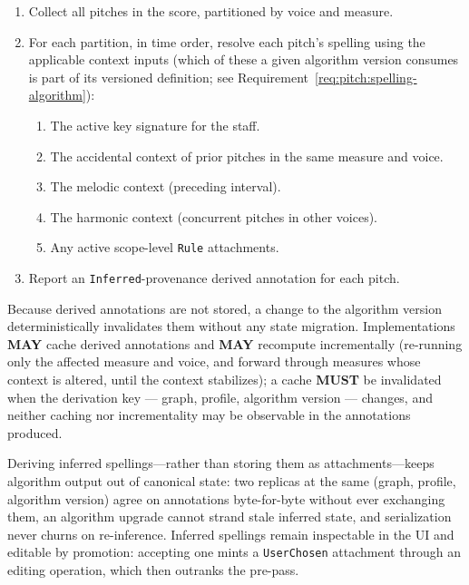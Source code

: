 \documentclass[11pt,letterpaper]{report}
\newcommand{\MUST}{\textbf{MUST}}
\newcommand{\MAY}{\textbf{MAY}}
\begin{document}
\begin{enumerate}
  \item Collect all pitches in the score, partitioned by voice and
    measure.
  \item For each partition, in time order, resolve each pitch's spelling
    using the applicable context inputs (which of these a given
    algorithm version consumes is part of its versioned definition;
    see Requirement~\ref{req:pitch:spelling-algorithm}):
    \begin{enumerate}
      \item The active key signature for the staff.
      \item The accidental context of prior pitches in the same measure
        and voice.
      \item The melodic context (preceding interval).
      \item The harmonic context (concurrent pitches in other voices).
      \item Any active scope-level \texttt{Rule} attachments.
    \end{enumerate}
  \item Report an \texttt{Inferred}-provenance derived annotation for
    each pitch.
\end{enumerate}

Because derived annotations are not stored, a change to the algorithm
version deterministically invalidates them without any state
migration. Implementations \MAY{} cache derived annotations and
\MAY{} recompute incrementally (re-running only the affected measure
and voice, and forward through measures whose context is altered,
until the context stabilizes); a cache \MUST{} be invalidated when
the derivation key --- graph, profile, algorithm version --- changes,
and neither caching nor incrementality may be observable in the
annotations produced.

\begin{rationale}
  Deriving inferred spellings---rather than storing them as
  attachments---keeps algorithm output out of canonical state: two
  replicas at the same (graph, profile, algorithm version) agree on
  annotations byte-for-byte without ever exchanging them, an
  algorithm upgrade cannot strand stale inferred state, and
  serialization never churns on re-inference. Inferred spellings
  remain inspectable in the UI and editable by promotion: accepting
  one mints a \texttt{UserChosen} attachment through an editing
  operation, which then outranks the pre-pass.
\end{rationale}
\end{document}
